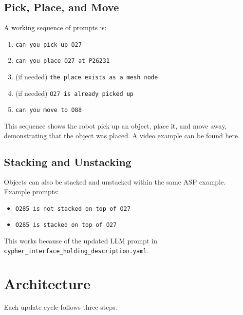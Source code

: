 \documentclass{article}
\begin{document}
\subsection{Pick, Place, and Move}

A working sequence of prompts is:

\begin{enumerate}
    \item \texttt{can you pick up O27}
    \item \texttt{can you place O27 at P26231}
    \item (if needed) \texttt{the place exists as a mesh node}
    \item (if needed) \texttt{O27 is already picked up}
    \item \texttt{can you move to O88}
\end{enumerate}

This sequence shows the robot pick up an object, place it, and move away,
demonstrating that the object was placed. A video example can be found \href{https://drive.google.com/file/d/1XK5phDP1UGnacWcVvxX2t8TuNP6Jwyv1/view?usp=sharing}{here}.

\subsection{Stacking and Unstacking}

Objects can also be stacked and unstacked within the same ASP example.
Example prompts:

\begin{itemize}
    \item \texttt{O285 is not stacked on top of O27}
    \item \texttt{O285 is stacked on top of O27}
\end{itemize}

This works because of the updated LLM prompt in
\texttt{cypher\_interface\_holding\_description.yaml}.

\section{Architecture}

Each update cycle follows three steps.
\end{document}
